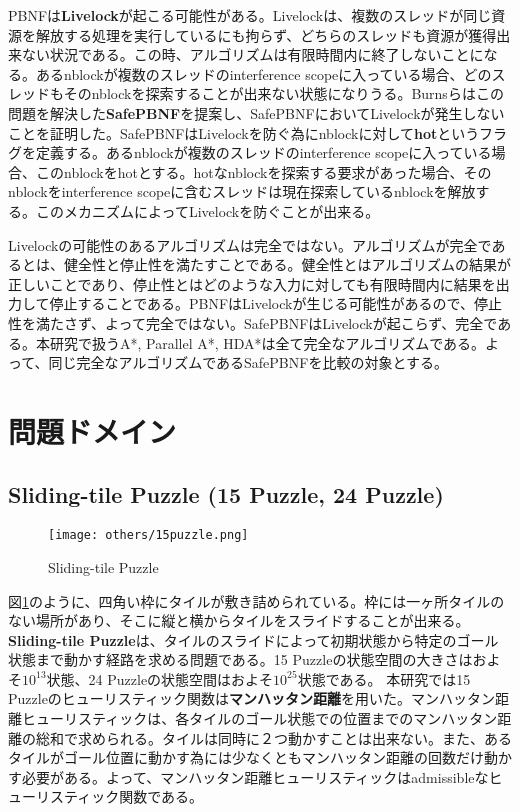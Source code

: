 \documentclass[uplatex]{jsarticle}
\begin{document}
PBNFは\textbf{Livelock}が起こる可能性がある。Livelockは、複数のスレッドが同じ資源を解放する処理を実行しているにも拘らず、どちらのスレッドも資源が獲得出来ない状況である。この時、アルゴリズムは有限時間内に終了しないことになる。あるnblockが複数のスレッドのinterference scopeに入っている場合、どのスレッドもそのnblockを探索することが出来ない状態になりうる。Burnsらはこの問題を解決した\textbf{SafePBNF}を提案し、SafePBNFにおいてLivelockが発生しないことを証明した。SafePBNFはLivelockを防ぐ為にnblockに対して\textbf{hot}というフラグを定義する。あるnblockが複数のスレッドのinterference scopeに入っている場合、このnblockをhotとする。hotなnblockを探索する要求があった場合、そのnblockをinterference scopeに含むスレッドは現在探索しているnblockを解放する。このメカニズムによってLivelockを防ぐことが出来る。

Livelockの可能性のあるアルゴリズムは完全ではない。アルゴリズムが完全であるとは、健全性と停止性を満たすことである。健全性とはアルゴリズムの結果が正しいことであり、停止性とはどのような入力に対しても有限時間内に結果を出力して停止することである。PBNFはLivelockが生じる可能性があるので、停止性を満たさず、よって完全ではない。SafePBNFはLivelockが起こらず、完全である。本研究で扱うA*, Parallel A*, HDA*は全て完全なアルゴリズムである。よって、同じ完全なアルゴリズムであるSafePBNFを比較の対象とする。


\newpage

\section{問題ドメイン}
\label{sec:domain}

\subsection{Sliding-tile Puzzle (15 Puzzle, 24 Puzzle)}

\begin{figure}[h]
	\centering
	\texttt{[image: others/15puzzle.png]}
	\caption{Sliding-tile Puzzle}
	\label{fig:15puzzle}
\end{figure}%
図\ref{fig:15puzzle}のように、四角い枠にタイルが敷き詰められている。枠には一ヶ所タイルのない場所があり、そこに縦と横からタイルをスライドすることが出来る。\textbf{Sliding-tile Puzzle}は、タイルのスライドによって初期状態から特定のゴール状態まで動かす経路を求める問題である。15 Puzzleの状態空間の大きさはおよそ$10^{13}$状態、24 Puzzleの状態空間はおよそ$10^{25}$状態である。 本研究では15 Puzzleのヒューリスティック関数は\textbf{マンハッタン距離}を用いた。マンハッタン距離ヒューリスティックは、各タイルのゴール状態での位置までのマンハッタン距離の総和で求められる。タイルは同時に２つ動かすことは出来ない。また、あるタイルがゴール位置に動かす為には少なくともマンハッタン距離の回数だけ動かす必要がある。よって、マンハッタン距離ヒューリスティックはadmissibleなヒューリスティック関数である。
\end{document}
